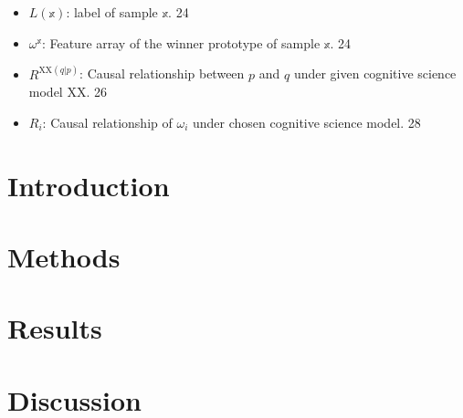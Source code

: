 \documentclass[12pt,twoside]{report}
\begin{document}
\begin{spacing}{1.5}
\begin{itemize}
\item $L(\mathbb{x})$: label of sample $\mathbb{x}$. 24

\item $\omega^{\mathbb{x}}$: Feature array of the winner prototype of sample $\mathbb{x}$. 24

\item $R^{\text{XX}(q|p)}$: Causal relationship between $p$ and $q$ under given cognitive science model XX. 26

\item $R_{i}$: Causal relationship of $\omega_{i}$ under chosen cognitive science model. 28

\end{itemize}

\end{spacing}


\clearpage

\pagestyle{fancy}

\chapter{Introduction}


\chapter{Methods}


\chapter{Results}


\chapter{Discussion}



\appendix
\setcounter{figure}{0}


\end{document}
